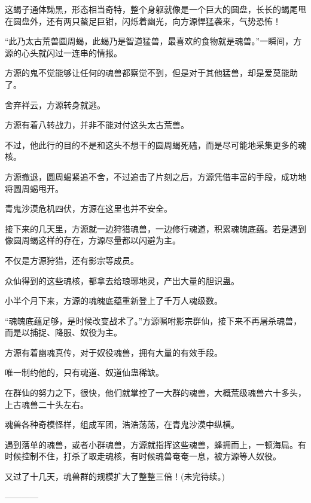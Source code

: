 \begin{this_body}
这蝎子通体黝黑，形态相当奇特，整个身躯就像是一个巨大的圆盘，长长的蝎尾甩在圆盘外，还有两只螯足巨钳，闪烁着幽光，向方源悍猛袭来，气势恐怖！

“此乃太古荒兽圆周蝎，此蝎乃是智道猛兽，最喜欢的食物就是魂兽。”一瞬间，方源的心头就闪过一连串的情报。

方源的鬼不觉能够让任何的魂兽都察觉不到，但是对于其他猛兽，却是爱莫能助了。

舍弃祥云，方源转身就逃。

方源有着八转战力，并非不能对付这头太古荒兽。

不过，他此行的目的不是和这头不想干的圆周蝎死磕，而是尽可能地采集更多的魂核。

方源撤退，圆周蝎紧追不舍，不过追击了片刻之后，方源凭借丰富的手段，成功地将圆周蝎甩开。

青鬼沙漠危机四伏，方源在这里也并不安全。

接下来的几天里，方源就一边狩猎魂兽，一边修行魂道，积累魂魄底蕴。若是遇到像圆周蝎这样的存在，方源尽量都以闪避为主。

不仅是方源狩猎，还有影宗等成员。

众仙得到的这些魂核，都拿去给琅琊地灵，产出大量的胆识蛊。

小半个月下来，方源的魂魄底蕴重新登上了千万人魂级数。

“魂魄底蕴足够，是时候改变战术了。”方源嘱咐影宗群仙，接下来不再屠杀魂兽，而是以捕捉、降服、奴役为主。

方源有着幽魂真传，对于奴役魂兽，拥有大量的有效手段。

唯一制约他的，只有魂道、奴道仙蛊稀缺。

在群仙的努力之下，很快，他们就掌控了一大群的魂兽，大概荒级魂兽六十多头，上古魂兽二十头左右。

魂兽各种奇模怪样，组成军团，浩浩荡荡，在青鬼沙漠中纵横。

遇到落单的魂兽，或者小群魂兽，方源就指挥这些魂兽，蜂拥而上，一顿海扁。有时候控制不住，打杀了取走魂核，有时候魂兽奄奄一息，被方源等人奴役。

又过了十几天，魂兽群的规模扩大了整整三倍！(未完待续。)

------------

\end{this_body}


